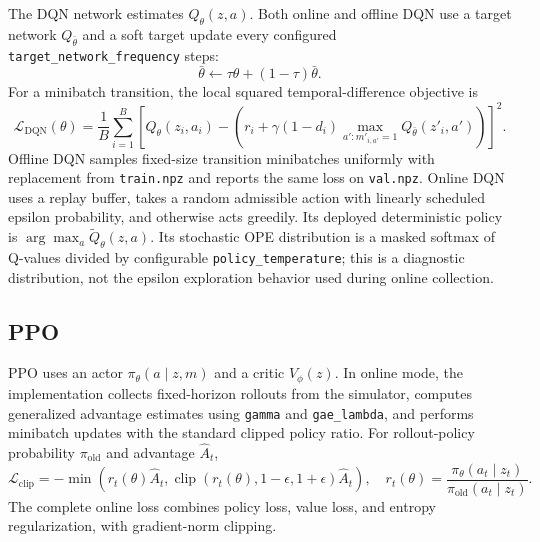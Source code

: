 \documentclass[10pt,twocolumn]{article}
\newcommand{\code}[1]{\texttt{#1}}
\newcommand{\policy}{\pi}
\begin{document}
The DQN network estimates $Q_\theta(z,a)$. Both online and offline DQN use a target network $Q_{\bar\theta}$ and a soft target update every configured \code{target\_network\_frequency} steps:
\begin{equation}
    \bar\theta \leftarrow \tau\theta + (1-\tau)\bar\theta.
\end{equation}
For a minibatch transition, the local squared temporal-difference objective is
\begin{equation}
 \mathcal{L}_{\mathrm{DQN}}(\theta) =
 \frac{1}{B}\sum_{i=1}^{B}
 \left[Q_\theta(z_i,a_i) - \left(r_i + \gamma(1-d_i)
 \max_{a':m'_{i,a'}=1}Q_{\bar\theta}(z'_i,a')\right)\right]^2.
\end{equation}
Offline DQN samples fixed-size transition minibatches uniformly with replacement from \code{train.npz} and reports the same loss on \code{val.npz}. Online DQN uses a replay buffer, takes a random admissible action with linearly scheduled epsilon probability, and otherwise acts greedily. Its deployed deterministic policy is $\arg\max_a \widetilde Q_\theta(z,a)$. Its stochastic OPE distribution is a masked softmax of Q-values divided by configurable \code{policy\_temperature}; this is a diagnostic distribution, not the epsilon exploration behavior used during online collection.

\subsection{PPO}
\label{sec:ppo}

PPO uses an actor $\policy_\theta(a\mid z,m)$ and a critic $V_\phi(z)$. In online mode, the implementation collects fixed-horizon rollouts from the simulator, computes generalized advantage estimates using \code{gamma} and \code{gae\_lambda}, and performs minibatch updates with the standard clipped policy ratio. For rollout-policy probability $\policy_{\mathrm{old}}$ and advantage $\hat A_t$,
\begin{equation}
 \mathcal{L}_{\mathrm{clip}} = -\min\left(
 r_t(\theta)\hat A_t,
 \operatorname{clip}(r_t(\theta),1-\epsilon,1+\epsilon)\hat A_t
 \right), \quad
 r_t(\theta)=\frac{\policy_\theta(a_t\mid z_t)}{\policy_{\mathrm{old}}(a_t\mid z_t)}.
\end{equation}
The complete online loss combines policy loss, value loss, and entropy regularization, with gradient-norm clipping.
\end{document}
